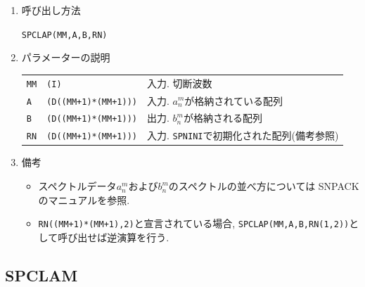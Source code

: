 \documentclass[a4j,fleqn]{jarticle}
\begin{document}
\begin{enumerate}
\item 呼び出し方法 
    
{\tt SPCLAP(MM,A,B,RN)}
  
\item パラメーターの説明

\begin{tabular}{lll}
{\tt MM} & {\tt (I)} & 入力. 切断波数\\
{\tt A} & {\tt (D((MM+1)*(MM+1)))} & 入力. $a^m_n$が格納されている配列\\
{\tt B} & {\tt (D((MM+1)*(MM+1)))} & 出力. $b^m_n$が格納される配列\\
{\tt RN} & {\tt (D((MM+1)*(MM+1)))} & 入力.
	{\tt SPNINI}で初期化された配列(備考参照)
\end{tabular}

\item 備考

\begin{itemize}

\item
スペクトルデータ$a^m_n$および$b^m_n$のスペクトルの並べ方については
SNPACKのマニュアルを参照. 

\item
{\tt RN((MM+1)*(MM+1),2)}と宣言されている場合,
{\tt SPCLAP(MM,A,B,RN(1,2))}として呼び出せば逆演算を行う.

\end{itemize}

\end{enumerate}


\subsection{SPCLAM}
\end{document}
